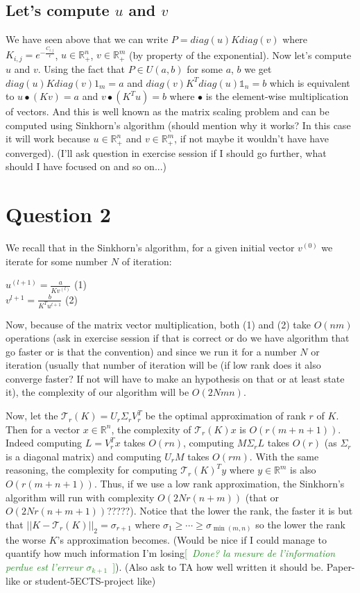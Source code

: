 \documentclass[a4paper]{article}
\theoremstyle{definition}
\theoremstyle{remark}
\newcommand{\R}{\mathbb{R}}
\newcommand{\com}[1]{\textcolor{ForestGreen}{[~\emph{#1}~]}}
\newcommand{\T}{\mathcal{T}}
\begin{document}
\subsection*{Let's compute $u$ and $v$}

We have seen above that we can write $P=diag(u)Kdiag(v)$ where $K_{i,j}=e^{-\frac{C_{i,j}}{\epsilon}}$, $u\in \R^n_+$, $v\in \R^m_+$ (by property of the exponential). Now let's compute $u$ and $v$. Using the fact that $P\in U(a,b)$ for some $a$, $b$ we get $diag(u)Kdiag(v){1}_m=a$ and $diag(v)K^Tdiag(u)\mathbb{1}_n=b$ which is equivalent to $u\bullet (Kv)=a$ and $v\bullet(K^Tu)=b$ where $\bullet$ is the element-wise multiplication of vectors. And this is well known as the matrix scaling problem and can be computed using Sinkhorn's algorithm (should mention why it works? In this case it will work because $u\in \R^n_+$ and $v\in \R^m_+$, if not maybe it wouldn't have have converged). 
(I'll ask question in exercise session if I should go further, what should I have focused on and so on...)

\section*{Question 2}

We recall that in the Sinkhorn's algorithm, for a given initial vector $v^{(0)}$ we iterate for some number $N$ of iteration:

$u^{(l+1)}=\frac{a}{Kv^{(l)}}$ (1) \\
$v^{l+1}=\frac{b}{K^Tu^{l+1}}$  (2)

Now, because of the matrix vector multiplication, both (1) and (2) take $O(nm)$ operations (ask in exercise session if that is correct or do we have algorithm that go faster or is that the convention) and since we run it for a number $N$ or iteration (usually that number of iteration will be 
(if low rank does it also converge faster? If not will have to make an hypothesis on that or at least state it), the complexity of our algorithm will be $O(2Nmn)$.

Now, let the $\T_r(K)=U_r\Sigma_rV^T_r$ be the optimal approximation of rank $r$ of $K$. Then for a vector $x \in \R^n$, the complexity of $\T_r(K)x$ is $O(r(m+n+1))$. Indeed computing $L=V^T_rx$ takes $O(rn)$, computing $M\Sigma_rL$ takes $O(r)$ (as $\Sigma_r$ is a diagonal matrix) and computing $U_rM$ takes $O(rm)$. With the same reasoning, the complexity for computing $\T_r(K)^Ty$ where $y\in \R^m$ is also $O(r(m+n+1))$. Thus, if we use a low rank approximation, the Sinkhorn's algorithm will run with complexity $O(2Nr(n+m))$ (that or $O(2Nr(n+m+1))$?????). Notice that the lower the rank, the faster it is but that $||K-\T_r(K)||_2=\sigma_{r+1}$ where $\sigma_1\geq \cdots \geq \sigma_{\min(m,n)}$ so the lower the rank the worse $K$'s approximation becomes. (Would be nice if I could manage to quantify how much information I'm losing\com{Done? la mesure de l'information perdue est l'erreur $\sigma_{k+1}$}). 
(Also ask to TA how well written it should be. Paper-like or student-5ECTS-project like)
\end{document}
